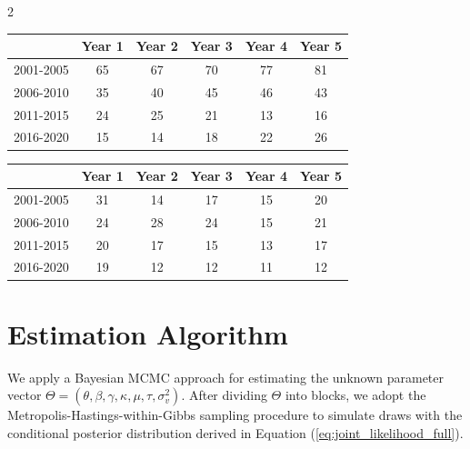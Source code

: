 \documentclass[12pt]{article}
\begin{document}
\begin{spacing}{2}
\begin{center}
\singlespacing
\begin{threeparttable}[tp]
\caption{\label{tab:rnd-data} Number of R\&D collaborations.}
    \begin{tabular}{lccccc}    
    \toprule
    & Year 1 & Year 2 & Year 3 & Year 4 & Year 5  \\
    \midrule
    2001-2005 & 65    & 67    & 70     & 77  & 81 \\
    2006-2010 & 35    & 40    & 45     & 46  & 43 \\
    2011-2015 & 24    & 25    & 21     & 13  & 16 \\
    2016-2020 & 15    & 14    & 18     & 22  & 26 \\   
    \bottomrule  
    \end{tabular}%
  \label{tab:addlabel}%
\end{threeparttable}
\end{center}

\begin{center}
\singlespacing
\begin{threeparttable}[tp]
\caption{\label{tab:mna-data} Number of M\&A deals.}
    \begin{tabular}{lccccc}    
    \toprule
    & Year 1 & Year 2 & Year 3 & Year 4 & Year 5  \\
    \midrule
    2001-2005 & 31    & 14    & 17     & 15  & 20 \\
    2006-2010 & 24    & 28    & 24     & 15  & 21 \\
    2011-2015 & 20    & 17    & 15     & 13  & 17 \\
    2016-2020 & 19    & 12    & 12     & 11  & 12 \\     
    \bottomrule  
    \end{tabular}%
  \label{tab:addlabel}%
\end{threeparttable}
\end{center}

\section{Estimation Algorithm}
\label{sec:estimation-algorithm}
We apply a Bayesian MCMC approach for estimating the unknown parameter vector $\Theta=(\theta,\beta,\gamma,\kappa,\mu,\tau,\sigma^2_v)$. After dividing $\Theta$ into blocks, we adopt the Metropolis-Hastings-within-Gibbs sampling procedure to simulate draws with the conditional posterior distribution derived in Equation (\ref{eq:joint_likelihood_full}).


\end{spacing}
\end{document}
